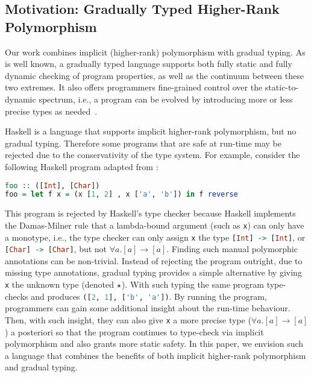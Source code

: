 \subsection{Motivation: Gradually Typed Higher-Rank Polymorphism}


Our work combines implicit
(higher-rank) polymorphism with gradual typing. As is well
known, a gradually typed language supports both fully static and fully dynamic
checking of program properties, as well as the continuum between these two
extremes. It also offers programmers fine-grained control over the
static-to-dynamic spectrum, i.e., a program can be evolved by introducing more
or less precise types as needed~\citep{garcia2016abstracting}. 

Haskell is a language that supports implicit
higher-rank polymorphism, but no gradual typing. Therefore
some programs that are safe at run-time may be rejected due to the
conservativity of the type system.
For example,
consider the following Haskell program adapted from \citet{jones2007practical}:
\begin{lstlisting}[language=haskell]
foo :: ([Int], [Char])
foo = let f x = (x [1, 2] , x ['a', 'b']) in f reverse
\end{lstlisting}
This program is rejected by Haskell's type checker because Haskell implements
the Damas-Milner rule that a lambda-bound argument (such as \lstinline[language=haskell]{x}) can
only have a monotype, i.e., the type checker can only assign
\lstinline[language=haskell]{x} the type \lstinline[language=haskell]{[Int] -> [Int]}, or
\lstinline[language=haskell]{[Char] -> [Char]}, but not $\forall a. [a]
\to [a]$. Finding such manual polymorphic annotations can be non-trivial.
Instead of rejecting the program outright, due to missing type annotations,
gradual typing provides a simple alternative by giving
\lstinline[language=haskell]$x$ the unknown type (denoted
$\star$). With such typing
the same program type-checks and produces
\lstinline[language=haskell]$([2, 1], ['b', 'a'])$. By running the
program, programmers
can gain some additional insight about
the run-time behaviour. Then, with such insight, they can also give
\lstinline[language=haskell]$x$ a more precise type ($\forall a. [a] \to
[a]$) a posteriori so
that the program continues to type-check via implicit polymorphism and also grants
more static safety. In this paper, we envision such a language that
combines the benefits of both implicit higher-rank polymorphism and gradual
typing.


